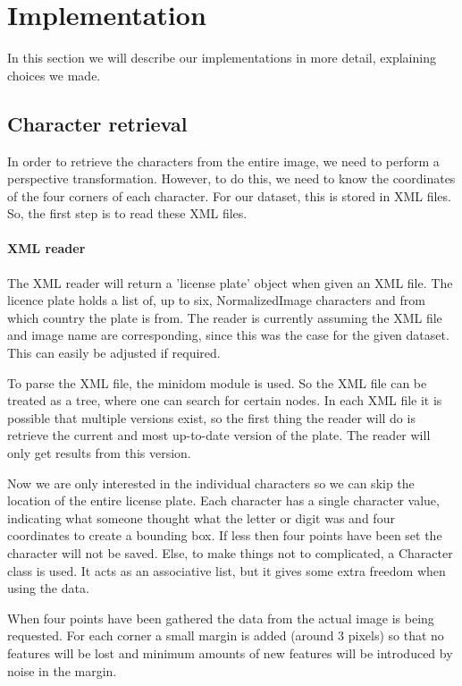 \documentclass[a4paper]{article}
\begin{document}
\section{Implementation}

In this section we will describe our implementations in more detail, explaining
choices we made.

\subsection{Character retrieval}

In order to retrieve the characters from the entire image, we need to
perform a perspective transformation. However, to do this, we need to know the
coordinates of the four corners of each character. For our dataset, this is
stored in XML files. So, the first step is to read these XML files.

\paragraph*{XML reader}

The XML reader will return a 'license plate' object when given an XML file. The
licence plate holds a list of, up to six, NormalizedImage characters and from
which country the plate is from. The reader is currently assuming the XML file
and image name are corresponding, since this was the case for the given
dataset. This can easily be adjusted if required.

To parse the XML file, the minidom module is used. So the XML file can be
treated as a tree, where one can search for certain nodes. In each XML
file it is possible that multiple versions exist, so the first thing the reader
will do is retrieve the current and most up-to-date version of the plate. The
reader will only get results from this version.

Now we are only interested in the individual characters so we can skip the
location of the entire license plate. Each character has
a single character value, indicating what someone thought what the letter or
digit was and four coordinates to create a bounding box. If less then four
points have been set the character will not be saved. Else, to make things not
to complicated, a Character class is used. It acts as an associative list, but
it gives some extra freedom when using the data.

When four points have been gathered the data from the actual image is being
requested. For each corner a small margin is added (around 3 pixels) so that no
features will be lost and minimum amounts of new features will be introduced by
noise in the margin.
\end{document}
